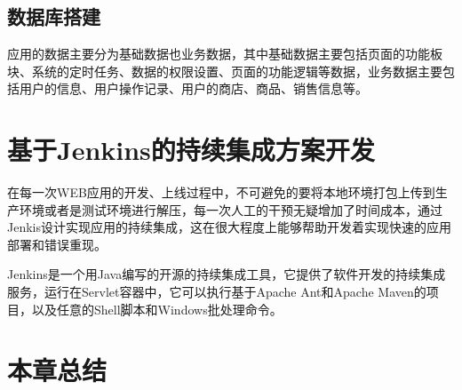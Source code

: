 \subsection{数据库搭建}
应用的数据主要分为基础数据也业务数据，其中基础数据主要包括页面的功能板块、系统的定时任务、数据的权限设置、页面的功能逻辑等数据，业务数据主要包括用户的信息、用户操作记录、用户的商店、商品、销售信息等。
\section{基于Jenkins的持续集成方案开发}
在每一次WEB应用的开发、上线过程中，不可避免的要将本地环境打包上传到生产环境或者是测试环境进行解压，每一次人工的干预无疑增加了时间成本，通过Jenkis设计实现应用的持续集成，这在很大程度上能够帮助开发着实现快速的应用部署和错误重现。

Jenkins是一个用Java编写的开源的持续集成工具，它提供了软件开发的持续集成服务，运行在Servlet容器中，它可以执行基于Apache Ant和Apache Maven的项目，以及任意的Shell脚本和Windows批处理命令。
\section{本章总结}